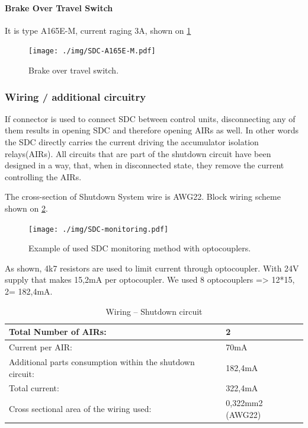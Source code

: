 \paragraph{Brake Over Travel Switch}
It is type A165E-M, current raging 3A, shown on \ref{fig:SDC-A165E-M}
\begin{figure}[H]
	\centering
	\texttt{[image: ./img/SDC-A165E-M.pdf]}
	\caption{Brake over travel switch.}
	\label{fig:SDC-A165E-M}
\end{figure}


\subsubsection{Wiring / additional circuitry}

If connector is used to connect SDC between control units, disconnecting any of them results in opening SDC and therefore opening AIRs as well. In other words the SDC directly carries the current driving the accumulator isolation relays(AIRs). All circuits that are part of the shutdown circuit have been designed in a way, that, when in disconnected state, they remove the current controlling the AIRs.

The cross-section of Shutdown System wire is AWG22. Block wiring scheme shown on \ref{fig:SDC-schematic}.\\

\begin{figure}[H]
	\centering
	\texttt{[image: ./img/SDC-monitoring.pdf]}
	\caption{Example of used SDC monitoring method with optocouplers.}
	\label{fig:SDC-schematic}
\end{figure}

As shown, 4k7 resistors are used to limit current through optocoupler. With 24V supply that makes 15,2mA per optocoupler. We used 8 optocouplers => 12*15, 2= 182,4mA.
\begin{table}[H]
	\centering
	\caption{Wiring – Shutdown circuit}
	\begin{tabularx}{\textwidth}{|X|X|}
		\hline
		Total Number of AIRs: & 2 \\[\TableSize]
		\hline
		Current per AIR: & 70mA \\[\TableSize]
		\hline
		Additional parts consumption within the shutdown circuit: & 182,4mA \\[\TableSize]
		\hline
		Total current: & 322,4mA \\[\TableSize]
		\hline
		Cross sectional area of the wiring used: & 0,322mm2 (AWG22) \\[\TableSize]
		\hline
	\end{tabularx}%
	\label{tab:SDC-Wiring}%
\end{table}%


